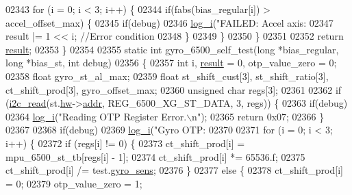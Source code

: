 \begin{DoxyCode}
{{{{{{{{{{{{{{{{{02343         \textcolor{keywordflow}{for} (i = 0; i < 3; i++) \{
02344             \textcolor{keywordflow}{if}(fabs(bias\_regular[i]) > accel\_offset\_max) \{
02345                 \textcolor{keywordflow}{if}(debug)
02346                     \hyperlink{inv__mpu_8c_a67fc07fa528d8e62dc7b88a847b563f5}{log\_i}(\textcolor{stringliteral}{"FAILED: Accel axis:%
02347                 result |= 1 << i;   \textcolor{comment}{//Error condition}
02348             \}
02349         \}
02350     \}
02351 
02352     \textcolor{keywordflow}{return} \hyperlink{sensor_8h_a4c9d9cb8bb9d2b707a152051408f40e5}{result};
02353 \}
02354 
02355 \textcolor{keyword}{static} \textcolor{keywordtype}{int} gyro\_6500\_self\_test(\textcolor{keywordtype}{long} *bias\_regular, \textcolor{keywordtype}{long} *bias\_st, \textcolor{keywordtype}{int} debug)
02356 \{
02357     \textcolor{keywordtype}{int} i, \hyperlink{sensor_8h_a4c9d9cb8bb9d2b707a152051408f40e5}{result} = 0, otp\_value\_zero = 0;
02358     \textcolor{keywordtype}{float} gyro\_st\_al\_max;
02359     \textcolor{keywordtype}{float} st\_shift\_cust[3], st\_shift\_ratio[3], ct\_shift\_prod[3], gyro\_offset\_max;
02360     \textcolor{keywordtype}{unsigned} \textcolor{keywordtype}{char} regs[3];
02361 
02362     \textcolor{keywordflow}{if} (\hyperlink{_i2_c_8c_ac2d47e7a6c76f93f9b537c31a2986e7b}{i2c\_read}(st.\hyperlink{structgyro__state__s_a5bac30a96752691e4cc723735060e360}{hw}->\hyperlink{structhw__s_a4c34a946600e9d68b6355d23f54d291b}{addr}, REG\_6500\_XG\_ST\_DATA, 3, regs)) \{
02363         \textcolor{keywordflow}{if}(debug)
02364             \hyperlink{inv__mpu_8c_a67fc07fa528d8e62dc7b88a847b563f5}{log\_i}(\textcolor{stringliteral}{"Reading OTP Register Error.\(\backslash\)n"});
02365         \textcolor{keywordflow}{return} 0x07;
02366     \}
02367 
02368     \textcolor{keywordflow}{if}(debug)
02369         \hyperlink{inv__mpu_8c_a67fc07fa528d8e62dc7b88a847b563f5}{log\_i}(\textcolor{stringliteral}{"Gyro OTP:%
02370 
02371     \textcolor{keywordflow}{for} (i = 0; i < 3; i++) \{
02372         \textcolor{keywordflow}{if} (regs[i] != 0) \{
02373             ct\_shift\_prod[i] = mpu\_6500\_st\_tb[regs[i] - 1];
02374             ct\_shift\_prod[i] *= 65536.f;
02375             ct\_shift\_prod[i] /= test.\hyperlink{structtest__s_a32da1174cf6569aa99bdff70055bb45a}{gyro\_sens};
02376         \}
02377         \textcolor{keywordflow}{else} \{
02378             ct\_shift\_prod[i] = 0;
02379             otp\_value\_zero = 1;
}}}}}}}}}}}}}}}}}}}
\end{DoxyCode}
